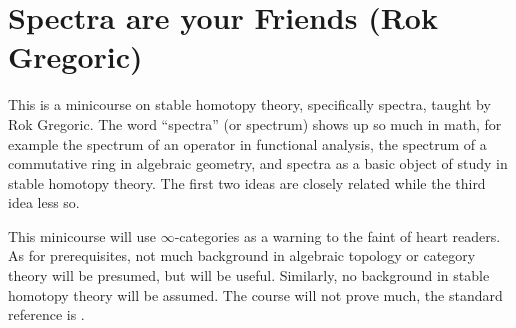 \section{Spectra are your Friends (Rok Gregoric)} 
This is a minicourse on stable homotopy theory, specifically spectra, taught by Rok Gregoric. The word ``spectra'' (or spectrum) shows up so much in math, for example the spectrum of an operator in functional analysis, the spectrum of a commutative ring in algebraic geometry, and spectra as a basic object of study in stable homotopy theory. The first two ideas are closely related while the third idea less so. 

This minicourse will use $\infty$-categories as a warning to the faint of heart readers. As for prerequisites, not much background in algebraic topology or category theory will be presumed, but will be useful. Similarly, no background in stable homotopy theory will be assumed. The course will not prove much, the standard reference is \cite{ref:lurie}.

